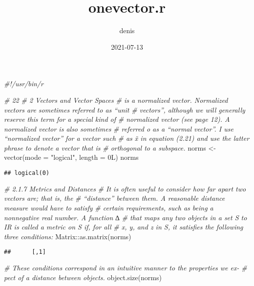 \documentclass[
]{article}
\title{onevector.r}
\author{denis}
\date{2021-07-13}
\newenvironment{Shaded}{\begin{snugshade}}{\end{snugshade}}
\newcommand{\AttributeTok}[1]{\textcolor[rgb]{0.77,0.63,0.00}{#1}}
\newcommand{\CommentTok}[1]{\textcolor[rgb]{0.56,0.35,0.01}{\textit{#1}}}
\newcommand{\FunctionTok}[1]{\textcolor[rgb]{0.00,0.00,0.00}{#1}}
\newcommand{\NormalTok}[1]{#1}
\newcommand{\OtherTok}[1]{\textcolor[rgb]{0.56,0.35,0.01}{#1}}
\newcommand{\SpecialCharTok}[1]{\textcolor[rgb]{0.00,0.00,0.00}{#1}}
\newcommand{\StringTok}[1]{\textcolor[rgb]{0.31,0.60,0.02}{#1}}
\begin{document}
\maketitle

\begin{Shaded}
\begin{Highlighting}[]
\CommentTok{\#!/usr/bin/r}

\CommentTok{\# 22}
\CommentTok{\# 2 Vectors and Vector Spaces}
\CommentTok{\# is a normalized vector. Normalized vectors are sometimes referred to as “unit}
\CommentTok{\# vectors”, although we will generally reserve this term for a special kind of }
\CommentTok{\# normalized vector (see page 12). A normalized vector is also sometimes }
\CommentTok{\# referred o as a “normal vector”. I use “normalized vector” for a vector such }
\CommentTok{\# as x̃ in equation (2.21) and use the latter phrase to denote a vector that is}
\CommentTok{\# orthogonal to a subspace.}
\NormalTok{norms }\OtherTok{\textless{}{-}} \FunctionTok{vector}\NormalTok{(}\AttributeTok{mode =} \StringTok{"logical"}\NormalTok{, }\AttributeTok{length =}\NormalTok{ 0L)}
\NormalTok{norms}
\end{Highlighting}
\end{Shaded}

\begin{verbatim}
## logical(0)
\end{verbatim}

\begin{Shaded}
\begin{Highlighting}[]
\CommentTok{\# 2.1.7 Metrics and Distances}
\CommentTok{\# It is often useful to consider how far apart two vectors are; that is, the }
\CommentTok{\# “distance” between them. A reasonable distance measure would have to satisfy}
\CommentTok{\# certain requirements, such as being a nonnegative real number. A function ∆}
\CommentTok{\# that maps any two objects in a set S to IR is called a metric on S if, for all}
\CommentTok{\# x, y, and z in S, it satisﬁes the following three conditions:}
\NormalTok{Matrix}\SpecialCharTok{::}\FunctionTok{as.matrix}\NormalTok{(norms)}
\end{Highlighting}
\end{Shaded}

\begin{verbatim}
##      [,1]
\end{verbatim}

\begin{Shaded}
\begin{Highlighting}[]
\CommentTok{\# These conditions correspond in an intuitive manner to the properties we ex{-}}
\CommentTok{\# pect of a distance between objects.}
\FunctionTok{object.size}\NormalTok{(norms)}
\end{Highlighting}
\end{Shaded}
\end{document}
